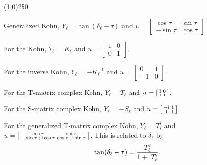\documentclass[preprint,showpacs,preprintnumbers,amsmath,amssymb]{revtex4}
\newcommand{\ii}{{\rm{i}}}
\begin{document}
\begin{center}
\line(1,0){250}
\end{center}

Generalized Kohn, $Y_\ell = \tan(\delta_\ell-\tau)$ and 
$u = \left[ \begin{smallmatrix}
\cos \tau & \sin \tau \\  -\sin \tau & \cos \tau
\end{smallmatrix} \right]$

For the Kohn, $Y_\ell = K_\ell$ and $u = \left[ \begin{smallmatrix}
1 & 0 \\ 0 & 1
\end{smallmatrix} \right]$.

For the inverse Kohn, $Y_\ell = -K_\ell^{-1}$ and $u = \left[ \begin{smallmatrix}
0 & 1 \\ -1 & 0
\end{smallmatrix} \right]$.

For the T-matrix complex Kohn, $Y_\ell = T_\ell$ and $u = \left[ \begin{smallmatrix}
1 & 0 \\ \ii & 1
\end{smallmatrix} \right]$.

For the S-matrix complex Kohn, $Y_\ell = -S_\ell$ and $u = \left[ \begin{smallmatrix}
-\ii & 1 \\ \ii & 1
\end{smallmatrix} \right]$.

For the generalized T-matrix complex Kohn, $Y_\ell = T_\ell^\prime$ and $u = \left[ \begin{smallmatrix}
\cos\tau & \sin\tau \\ -\sin\tau + \ii \cos\tau & \cos\tau + \ii \sin\tau
\end{smallmatrix} \right]$. This is related to $\delta_\ell$ by
\begin{equation}
\tan(\delta_\ell - \tau) = \frac{T_\ell^\prime}{1+\ii T_\ell^\prime}.
\end{equation}
\end{document}
